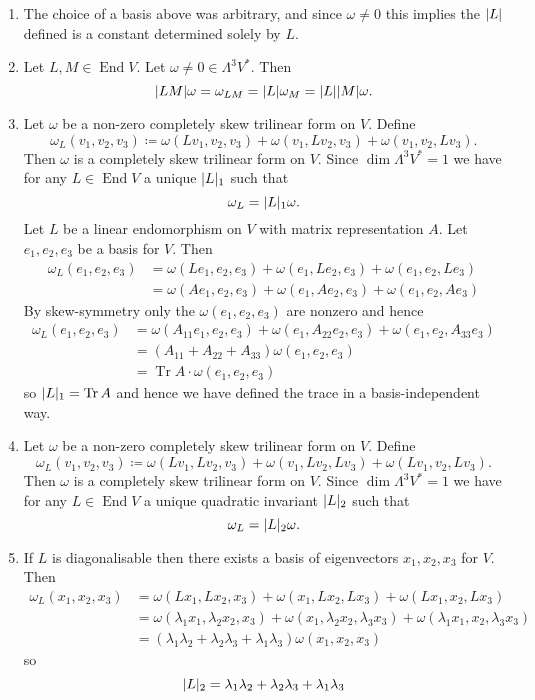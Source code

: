 \documentclass[a4paper, 12pt]{article}
\DeclarePairedDelimiter\abs{\lvert}{\rvert}
\DeclareMathOperator{\trace}{Tr}
\DeclareMathOperator{\Endo}{End}
\begin{document}
\begin{enumerate}
\begin{enumerate}
\item The choice of a basis above was arbitrary, and since \(\omega\neq0\) this implies the \(\abs{L}\) defined is a constant determined solely by \(L\).

\item Let \(L,M\in\Endo{V}\). Let \(\omega\neq0\in\Lambda^3V^*\). Then
\[\abs{LM}\omega=\omega_{LM}=\abs L\omega_M=\abs L\abs M\omega.\]

\item Let \(\omega\) be a non-zero completely skew trilinear form on \(V\). Define
\[\omega_L(v_1,v_2,v_3)\coloneqq\omega(Lv_1,v_2,v_3)+\omega(v_1,Lv_2,v_3)+\omega(v_1,v_2,Lv_3).\]
Then \(\omega\) is a completely skew trilinear form on \(V\). Since \(\dim\Lambda^3V^*=1\) we have for any \(L\in\Endo V\) a unique \(\abs{L}_1\) such that
\[\omega_L=\abs{L}_1\omega.\]
Let \(L\) be a linear endomorphism on \(V\) with matrix representation \(A\). Let \(e_1,e_2,e_3\) be a basis for \(V\). Then
\begin{align*}
\omega_L(e_1,e_2,e_3)&=\omega(Le_1,e_2,e_3)+\omega(e_1,Le_2,e_3)+\omega(e_1,e_2,Le_3)\\
&=\omega(Ae_1,e_2,e_3)+\omega(e_1,Ae_2,e_3)+\omega(e_1,e_2,Ae_3)
\end{align*}
By skew-symmetry only the \(\omega(e_1,e_2,e_3)\) are nonzero and hence
\begin{align*}
\omega_L(e_1,e_2,e_3)&=\omega(A_{11}e_1,e_2,e_3)+\omega(e_1,A_{22}e_2,e_3)+\omega(e_1,e_2,A_{33}e_3)\\
&=(A_{11}+A_{22}+A_{33})\omega(e_1,e_2,e_3)\\
&=\trace A\cdot\omega(e_1,e_2,e_3)
\end{align*}
so \(\abs{L}_1=\trace A\) and hence we have defined the trace in a basis-independent way.

\item Let \(\omega\) be a non-zero completely skew trilinear form on \(V\). Define
\[\omega_L(v_1,v_2,v_3)\coloneqq\omega(Lv_1,Lv_2,v_3)+\omega(v_1,Lv_2,Lv_3)+\omega(Lv_1,v_2,Lv_3).\]
Then \(\omega\) is a completely skew trilinear form on \(V\). Since \(\dim\Lambda^3V^*=1\) we have for any \(L\in\Endo V\) a unique quadratic invariant \(\abs{L}_2\) such that
\[\omega_L=\abs{L}_2\omega.\]

\item If \(L\) is diagonalisable then there exists a basis of eigenvectors \(x_1,x_2,x_3\) for \(V\). Then
\begin{align*}
\omega_L(x_1,x_2,x_3)&=\omega(Lx_1,Lx_2,x_3)+\omega(x_1,Lx_2,Lx_3)+\omega(Lx_1,x_2,Lx_3)\\
&=\omega(\lambda_1x_1,\lambda_2x_2,x_3)+\omega(x_1,\lambda_2x_2,\lambda_3x_3)+\omega(\lambda_1x_1,x_2,\lambda_3x_3)\\
&=(\lambda_1\lambda_2+\lambda_2\lambda_3+\lambda_1\lambda_3)\omega(x_1,x_2,x_3)
\end{align*}
so
\[\abs{L}_2=\lambda_1\lambda_2+\lambda_2\lambda_3+\lambda_1\lambda_3\]


\end{enumerate}
\end{enumerate}
\end{document}
